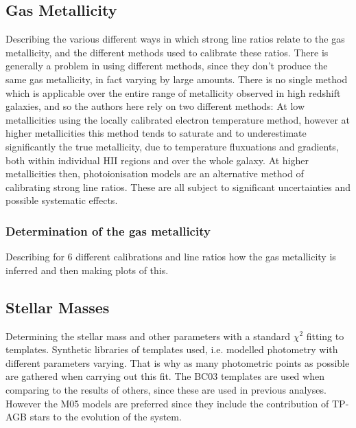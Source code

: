 \documentclass{literature}
\begin{document}
\subsection{Gas Metallicity}
Describing the various different ways in which strong line ratios relate to the gas metallicity, and the different methods used to calibrate these ratios. There is generally a problem in using different methods, since they don't produce the same gas metallicity, in fact varying by large amounts. There is no single method which is applicable over the entire range of metallicity observed in high redshift galaxies, and so the authors here rely on two different methods: At low metallicities using the locally calibrated electron temperature method, however at higher metallicities this method tends to saturate and to underestimate significantly the true metallicity, due to temperature fluxuations and gradients, both within individual HII regions and over the whole galaxy. At higher metallicities then, photoionisation models are an alternative method of calibrating strong line ratios. These are all subject to significant uncertainties and possible systematic effects.
\subsubsection{Determination of the gas metallicity}
Describing for 6 different calibrations and line ratios how the gas metallicity is inferred and then making plots of this.
\subsection{Stellar Masses}
Determining the stellar mass and other parameters with a standard $\chi ^{2}$ fitting to templates. Synthetic libraries of templates used, i.e. modelled photometry with different parameters varying. That is why as many photometric points as possible are gathered when carrying out this fit. The BC03 \citep{Bruzual2003} templates are used when comparing to the results of others, since these are used in previous analyses. However the M05 \citep{Maraston2005} models are preferred since they include the contribution of TP-AGB stars to the evolution of the system.
\end{document}

